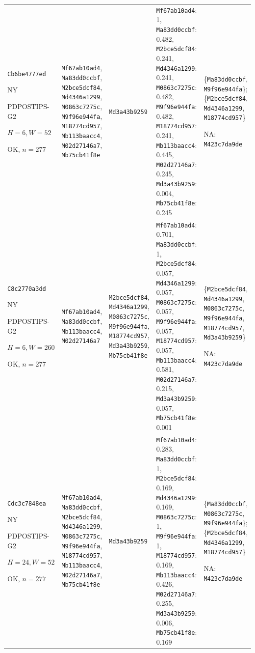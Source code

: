 \begin{longtable}{p{.15\linewidth}p{.17\linewidth}p{.17\linewidth}p{.25\linewidth}p{.14\linewidth}}
\texttt{Cb6be4777ed}\par NY\par PDPOSTIPS-\allowbreak{}G2\par $H=6,W=52$\par OK, $n=277$ & \texttt{Mf67ab10ad4}, \texttt{Ma83dd0ccbf}, \texttt{M2bce5dcf84}, \texttt{Md4346a1299}, \texttt{M0863c7275c}, \texttt{M9f96e944fa}, \texttt{M18774cd957}, \texttt{Mb113baacc4}, \texttt{M02d27146a7}, \texttt{Mb75cb41f8e} & \texttt{Md3a43b9259} & \texttt{Mf67ab10ad4}: 1, \texttt{Ma83dd0ccbf}: 0.482, \texttt{M2bce5dcf84}: 0.241, \texttt{Md4346a1299}: 0.241, \texttt{M0863c7275c}: 0.482, \texttt{M9f96e944fa}: 0.482, \texttt{M18774cd957}: 0.241, \texttt{Mb113baacc4}: 0.445, \texttt{M02d27146a7}: 0.245, \texttt{Md3a43b9259}: 0.004, \texttt{Mb75cb41f8e}: 0.245 & \{\texttt{Ma83dd0ccbf}, \texttt{M9f96e944fa}\}; \{\texttt{M2bce5dcf84}, \texttt{Md4346a1299}, \texttt{M18774cd957}\}\par NA: \texttt{M423c7da9de} \\
\texttt{C8c2770a3dd}\par NY\par PDPOSTIPS-\allowbreak{}G2\par $H=6,W=260$\par OK, $n=277$ & \texttt{Mf67ab10ad4}, \texttt{Ma83dd0ccbf}, \texttt{Mb113baacc4}, \texttt{M02d27146a7} & \texttt{M2bce5dcf84}, \texttt{Md4346a1299}, \texttt{M0863c7275c}, \texttt{M9f96e944fa}, \texttt{M18774cd957}, \texttt{Md3a43b9259}, \texttt{Mb75cb41f8e} & \texttt{Mf67ab10ad4}: 0.701, \texttt{Ma83dd0ccbf}: 1, \texttt{M2bce5dcf84}: 0.057, \texttt{Md4346a1299}: 0.057, \texttt{M0863c7275c}: 0.057, \texttt{M9f96e944fa}: 0.057, \texttt{M18774cd957}: 0.057, \texttt{Mb113baacc4}: 0.581, \texttt{M02d27146a7}: 0.215, \texttt{Md3a43b9259}: 0.057, \texttt{Mb75cb41f8e}: 0.001 & \{\texttt{M2bce5dcf84}, \texttt{Md4346a1299}, \texttt{M0863c7275c}, \texttt{M9f96e944fa}, \texttt{M18774cd957}, \texttt{Md3a43b9259}\}\par NA: \texttt{M423c7da9de} \\
\texttt{Cdc3c7848ea}\par NY\par PDPOSTIPS-\allowbreak{}G2\par $H=24,W=52$\par OK, $n=277$ & \texttt{Mf67ab10ad4}, \texttt{Ma83dd0ccbf}, \texttt{M2bce5dcf84}, \texttt{Md4346a1299}, \texttt{M0863c7275c}, \texttt{M9f96e944fa}, \texttt{M18774cd957}, \texttt{Mb113baacc4}, \texttt{M02d27146a7}, \texttt{Mb75cb41f8e} & \texttt{Md3a43b9259} & \texttt{Mf67ab10ad4}: 0.283, \texttt{Ma83dd0ccbf}: 1, \texttt{M2bce5dcf84}: 0.169, \texttt{Md4346a1299}: 0.169, \texttt{M0863c7275c}: 1, \texttt{M9f96e944fa}: 1, \texttt{M18774cd957}: 0.169, \texttt{Mb113baacc4}: 0.426, \texttt{M02d27146a7}: 0.255, \texttt{Md3a43b9259}: 0.006, \texttt{Mb75cb41f8e}: 0.169 & \{\texttt{Ma83dd0ccbf}, \texttt{M0863c7275c}, \texttt{M9f96e944fa}\}; \{\texttt{M2bce5dcf84}, \texttt{Md4346a1299}, \texttt{M18774cd957}\}\par NA: \texttt{M423c7da9de} \\

\end{longtable}
